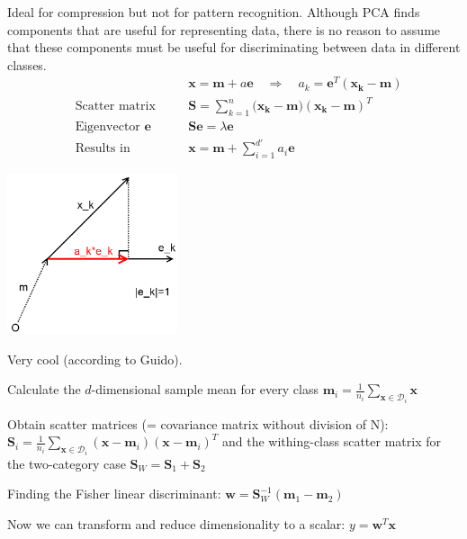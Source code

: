   \begin{minipage}{13cm}
  
  Ideal for compression but not for pattern recognition.
  Although PCA finds components that are useful for representing data, there is no reason to 
  assume that these components must be useful for discriminating between data in different classes.\\
  \begin{align*}
	&  && \bm{x}=\bm{m}+a \bm{e} \quad \Rightarrow \quad a_k=\bm{e}^T(\bm{x_k-m}) \\
    &\text{Scatter matrix} \quad && \bm{S} = \sum\limits_{k=1}^{n}{\bm{(x_k}-\bm{m})(\bm{x_k}-\bm{m})^T} \\
    &\text{Eigenvector } \bm{e} \quad && \bm{S e}=\lambda \bm{e} \\
    &\text{Results in} && \bm{x}=\bm{m}+\sum\limits_{i=1}^{d'}{a_i \bm{e}}
  \end{align*}

  \end{minipage}
  \begin{minipage}{5cm}
  	\includegraphics[width=5cm]{./images/principalComp.png}
  \end{minipage} 
  \begin{minipage}{10.5cm}
  Very cool (according to Guido).
    \begin{aufzaehlung}
      \item Calculate the $d$-dimensional sample mean for every class
        $\bm{m}_i = \frac{1}{n_i} \sum\limits_{\bm{x} \in \mathcal{D}_i} \bm{x}$
      \item Obtain scatter matrices (= covariance matrix without division of N):
        $\bm{S}_i = \frac{1}{n_i} \sum\limits_{\bm{x} \in \mathcal{D}_i} 
        (\bm{x}-\bm{m}_i) (\bm{x}-\bm{m}_i)^T$
        and the withing-class scatter matrix for the two-category case
        $\bm{S}_W = \bm{S}_1 + \bm{S}_2$
      \item Finding the Fisher linear discriminant:
        $\bm{w} = \bm{S}_W^{-1} (\bm{m}_1 - \bm{m}_2)$
      \item Now we can transform and reduce dimensionality to a scalar:
        $y = \bm{w}^T \bm{x}$
    \end{aufzaehlung}
  \end{minipage}\hspace{5mm}
